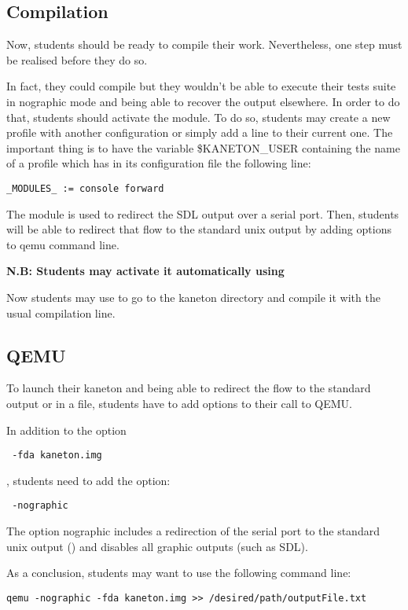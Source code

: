 \subsection{Compilation}
Now, students should be ready to compile their work. Nevertheless, one step must be realised before they do so.

In fact, they could compile but they wouldn't be able to execute their tests suite in nographic mode and being able to recover the output elsewhere. In order to do that, students should activate the  module. To do so, students may create a new profile with another configuration or simply add a line to their current one. The important thing is to have the variable \$KANETON\_USER containing the name of a profile which has in its configuration file the following line:

\begin{verbatim}
_MODULES_ := console forward
\end{verbatim}

The  module is used to redirect the SDL output over a serial port. Then, students will be able to redirect that flow to the standard unix output by adding options to qemu command line.

\textbf{N.B: Students may activate it automatically using }

Now students may use  to go to the kaneton directory and compile it with the usual compilation line.

\subsection{QEMU}
To launch their kaneton and being able to redirect the flow to the standard output or in a file, students have to add options to their call to QEMU.

In addition to  the option
\begin{verbatim} -fda kaneton.img \end{verbatim}
, students need to add the option:
\begin{verbatim} -nographic \end{verbatim}
The option nographic includes a redirection of the serial port to the standard unix output () and disables all graphic outputs (such as SDL).

As a conclusion, students may want to use the following command line:
\begin{verbatim}
qemu -nographic -fda kaneton.img >> /desired/path/outputFile.txt
\end{verbatim}


